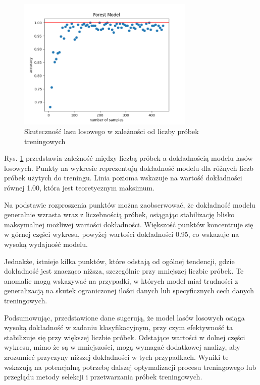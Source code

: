 \documentclass{article}
\begin{document}
\begin{figure}[H]
    \centering
    \includegraphics[width=0.75\textwidth]{las_losowy/transfer_labelling_forest.png}
    \caption{Skuteczność lasu losowego w zależności od liczby próbek treningowych}
    \label{fig:data_chart1}
\end{figure}

Rys. \ref{fig:data_chart1} przedstawia zależność między liczbą próbek a dokładnością modelu lasów losowych. Punkty na wykresie reprezentują dokładność modelu dla różnych liczb próbek użytych do treningu. Linia pozioma wskazuje na wartość dokładności równej 1.00, która jest teoretycznym maksimum.

Na podstawie rozproszenia punktów można zaobserwować, że dokładność modelu generalnie wzrasta wraz z liczebnością próbek, osiągając stabilizację blisko maksymalnej możliwej wartości dokładności. Większość punktów koncentruje się w górnej części wykresu, powyżej wartości dokładności 0.95, co wskazuje na wysoką wydajność modelu.

Jednakże, istnieje kilka punktów, które odstają od ogólnej tendencji, gdzie dokładność jest znacząco niższa, szczególnie przy mniejszej liczbie próbek. Te anomalie mogą wskazywać na przypadki, w których model miał trudności z generalizacją na skutek ograniczonej ilości danych lub specyficznych cech danych treningowych.

Podsumowując, przedstawione dane sugerują, że model lasów losowych osiąga wysoką dokładność w zadaniu klasyfikacyjnym, przy czym efektywność ta stabilizuje się przy większej liczbie próbek. Odstające wartości w dolnej części wykresu, mimo że są w mniejszości, mogą wymagać dodatkowej analizy, aby zrozumieć przyczyny niższej dokładności w tych przypadkach. Wyniki te wskazują na potencjalną potrzebę dalszej optymalizacji procesu treningowego lub przeglądu metody selekcji i przetwarzania próbek treningowych.
\newpage
\end{document}
